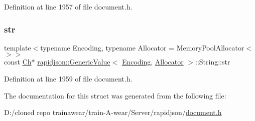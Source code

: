 Definition at line 1957 of file document.\+h.

\mbox{\label{structrapidjson_1_1_generic_value_1_1_string_a80454c0a6f9451f7d37916e04c899ff4}} 
\subsubsection{\texorpdfstring{str}{str}}
{\footnotesize\ttfamily template$<$typename Encoding, typename Allocator = Memory\+Pool\+Allocator$<$$>$$>$ \\
const \mbox{\hyperlink{classrapidjson_1_1_generic_value_adcdbc7fa85a9a41b78966d7e0dcc2ac4}{Ch}}$\ast$ \mbox{\hyperlink{classrapidjson_1_1_generic_value}{rapidjson\+::\+Generic\+Value}}$<$ \mbox{\hyperlink{classrapidjson_1_1_encoding}{Encoding}}, \mbox{\hyperlink{classrapidjson_1_1_allocator}{Allocator}} $>$\+::String\+::str}



Definition at line 1959 of file document.\+h.



The documentation for this struct was generated from the following file\+:\begin{DoxyCompactItemize}
\item 
D\+:/cloned repo trainawear/train-\/\+A-\/wear/\+Server/rapidjson/\mbox{\hyperlink{document_8h}{document.\+h}}\end{DoxyCompactItemize}

